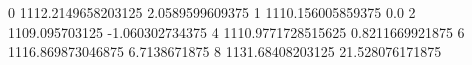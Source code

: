 0 1112.2149658203125 2.0589599609375
1 1110.156005859375 0.0
2 1109.095703125 -1.060302734375
4 1110.9771728515625 0.8211669921875
6 1116.869873046875 6.7138671875
8 1131.68408203125 21.528076171875
